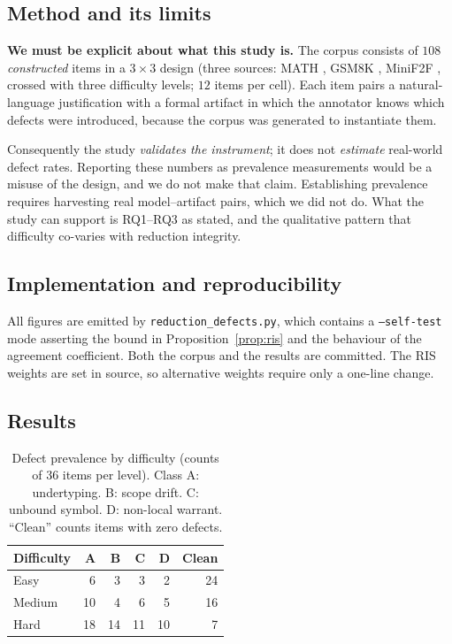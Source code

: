 \documentclass[11pt,a4paper]{article}
\theoremstyle{plain}
\theoremstyle{definition}
\newcommand{\code}[1]{\texttt{#1}}
\begin{document}
\subsection{Method and its limits}
\label{sec:limits}

\textbf{We must be explicit about what this study is.} The corpus consists of
$108$ \emph{constructed} items in a $3\times3$ design (three sources: MATH
\citep{hendrycks2021math}, GSM8K \citep{cobbe2021verifiers}, MiniF2F
\citep{minif2f2021}, crossed with three difficulty levels; $12$ items per
cell). Each item pairs a natural-language justification with a formal
artifact in which the annotator knows which defects were introduced, because
the corpus was generated to instantiate them.

Consequently the study \emph{validates the instrument}; it does not
\emph{estimate} real-world defect rates. Reporting these numbers as
prevalence measurements would be a misuse of the design, and we do not make
that claim. Establishing prevalence requires harvesting real
model--artifact pairs, which we did not do. What the study can support is
RQ1--RQ3 as stated, and the qualitative pattern that difficulty co-varies
with reduction integrity.

\subsection{Implementation and reproducibility}

All figures are emitted by \code{reduction\_defects.py}, which contains a
\code{--self-test} mode asserting the bound in
Proposition~\ref{prop:ris} and the behaviour of the agreement coefficient.
Both the corpus and the results are committed. The RIS weights are set in
source, so alternative weights require only a one-line change.

\subsection{Results}

\begin{table}[htbp]
\centering
\caption{Defect prevalence by difficulty (counts of 36 items per level).
Class A: undertyping. B: scope drift. C: unbound symbol. D: non-local
warrant. ``Clean'' counts items with zero defects.}
\label{tab:defects}
\begin{tabular}{lrrrrr}
\toprule
Difficulty & A & B & C & D & Clean \\
\midrule
Easy   & 6  & 3  & 3  & 2  & 24 \\
Medium & 10 & 4  & 6  & 5  & 16 \\
Hard   & 18 & 14 & 11 & 10 & 7  \\
\bottomrule
\end{tabular}
\end{table}
\end{document}

